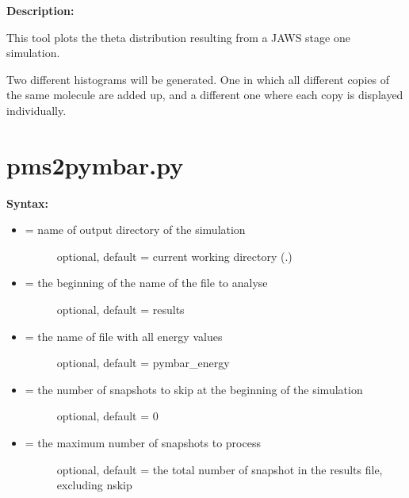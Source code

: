 \documentclass[letterpaper,10pt,english]{sphinxmanual}
\begin{document}
\textbf{Description:}

This tool plots the theta distribution resulting from a JAWS stage one simulation.

Two different histograms will be generated. One in which all different copies of the same molecule are added up, and a different one where each copy is displayed individually.


\section{pms2pymbar.py}
\label{tools:pms2pymbar-py}
\textbf{Syntax:}

\begin{itemize}
\item {} \begin{description}
\item[{ = name of output directory of the simulation}] \leavevmode
optional, default = current working directory (.)

\end{description}

\item {} \begin{description}
\item[{ = the beginning of the name of the file to analyse}] \leavevmode
optional, default = results

\end{description}

\item {} \begin{description}
\item[{ = the name of file with all energy values}] \leavevmode
optional, default = pymbar\_energy

\end{description}

\item {} \begin{description}
\item[{ = the number of snapshots to skip at the beginning of the simulation}] \leavevmode
optional, default = 0

\end{description}

\item {} \begin{description}
\item[{ = the maximum number of snapshots to process}] \leavevmode
optional, default = the total number of snapshot in the results file, excluding nskip


\end{description}
\end{itemize}
\end{document}
